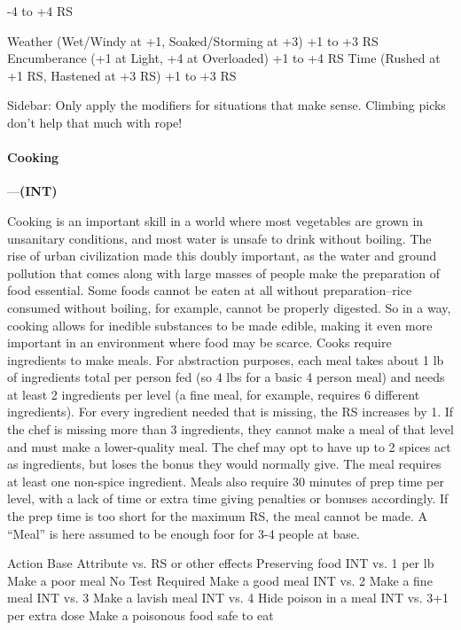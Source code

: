 \documentclass[oneside,11pt,english]{book}
\begin{document}
-4 to +4 RS 

Weather (Wet/Windy at +1, Soaked/Storming at +3) +1 to +3 RS 
Encumberance (+1 at Light, +4 at Overloaded) +1 to +4 RS 
Time (Rushed at +1 RS, Hastened at +3 RS) +1 to +3 RS 


 
Sidebar: 
Only apply the modifiers for situations that make sense. Climbing picks don’t help that much with rope! 

 

\paragraph{\label{skill:Cooking}Cooking}---\quad\textbf{(INT) }\par
Cooking is an important skill in a world where most vegetables are grown in unsanitary conditions, and most water is unsafe to drink without boiling. The rise of urban civilization made this doubly important, as the water and ground pollution that comes along with large masses of people make the preparation of food essential. Some foods cannot be eaten at all without preparation--rice consumed without boiling, for example, cannot be properly digested. So in a way, cooking allows for inedible substances to be made edible, making it even more important in an environment where food may be scarce. Cooks require ingredients to make meals. For abstraction purposes, each meal takes about 1 lb of ingredients total per person fed (so 4 lbs for a basic 4 person meal) and needs at least 2 ingredients per level (a fine meal, for example, requires 6 different ingredients). For every ingredient needed that is missing, the RS increases by 1. If the chef is missing more than 3 ingredients, they cannot make a meal of that level and must make a lower-quality meal. The chef may opt to have up to 2 spices act as ingredients, but loses the bonus they would normally give. The meal requires at least one non-spice ingredient. Meals also require 30 minutes of prep time per level, with a lack of time or extra time giving penalties or bonuses accordingly. If the prep time is too short for the maximum RS, the meal cannot be made. A “Meal” is here assumed to be enough foor for 3-4 people at base.


Action Base Attribute vs. RS or other effects 
Preserving food INT vs. 1 per lb 
Make a poor meal No Test Required 
Make a good meal INT vs. 2 
Make a fine meal INT vs. 3 
Make a lavish meal INT vs. 4 
Hide poison in a meal INT vs. 3+1 per extra dose 
Make a poisonous food safe to 
eat 
\end{document}
